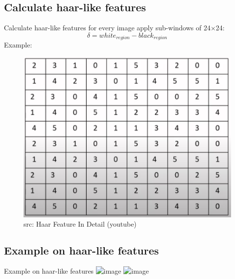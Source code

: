 \documentclass[aspectratio=169]{beamer}
\begin{document}
\subsection{Calculate haar-like features}
\begin{frame}{Calculate haar-like features}
    for every image apply sub-windows of 24$\times$24:
    \begin{equation}
        \delta = white_{region} - black_{region}
    \end{equation}
    Example: \\
    \begin{minipage}{0.3\linewidth}
        \centering
    \end{minipage}
    \begin{minipage}{0.6\linewidth}
        \centering
        \begin{figure}
            \includegraphics[width=.65\linewidth]{assets/figures/img-pixels.png}
            \caption{src: Haar Feature In Detail (youtube) \cite{HaarFeaturesIndetail}}
        \end{figure}
    \end{minipage}
\end{frame}
\subsection{Example on haar-like features}
\begin{frame}{Example on haar-like features}
    \centering
    \includegraphics<1>[width=0.85\linewidth]{assets/figures/haar-appleid01.png}
    \includegraphics<2>[width=0.85\linewidth]{assets/figures/haar-appleid02.png}
\end{frame}
\end{document}
